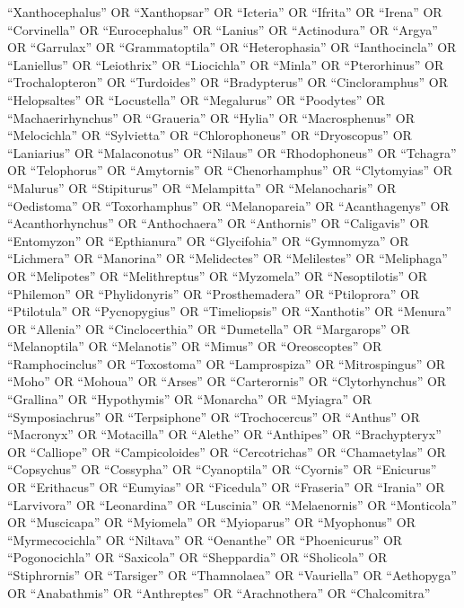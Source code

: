 \documentclass[
  number,
  review,
  onecolumn]{elsarticle}
\begin{document}
``Xanthocephalus'' OR ``Xanthopsar'' OR ``Icteria'' OR ``Ifrita'' OR
``Irena'' OR ``Corvinella'' OR ``Eurocephalus'' OR ``Lanius'' OR
``Actinodura'' OR ``Argya'' OR ``Garrulax'' OR ``Grammatoptila'' OR
``Heterophasia'' OR ``Ianthocincla'' OR ``Laniellus'' OR ``Leiothrix''
OR ``Liocichla'' OR ``Minla'' OR ``Pterorhinus'' OR ``Trochalopteron''
OR ``Turdoides'' OR ``Bradypterus'' OR ``Cincloramphus'' OR
``Helopsaltes'' OR ``Locustella'' OR ``Megalurus'' OR ``Poodytes'' OR
``Machaerirhynchus'' OR ``Graueria'' OR ``Hylia'' OR ``Macrosphenus'' OR
``Melocichla'' OR ``Sylvietta'' OR ``Chlorophoneus'' OR ``Dryoscopus''
OR ``Laniarius'' OR ``Malaconotus'' OR ``Nilaus'' OR ``Rhodophoneus'' OR
``Tchagra'' OR ``Telophorus'' OR ``Amytornis'' OR ``Chenorhamphus'' OR
``Clytomyias'' OR ``Malurus'' OR ``Stipiturus'' OR ``Melampitta'' OR
``Melanocharis'' OR ``Oedistoma'' OR ``Toxorhamphus'' OR
``Melanopareia'' OR ``Acanthagenys'' OR ``Acanthorhynchus'' OR
``Anthochaera'' OR ``Anthornis'' OR ``Caligavis'' OR ``Entomyzon'' OR
``Epthianura'' OR ``Glycifohia'' OR ``Gymnomyza'' OR ``Lichmera'' OR
``Manorina'' OR ``Melidectes'' OR ``Melilestes'' OR ``Meliphaga'' OR
``Melipotes'' OR ``Melithreptus'' OR ``Myzomela'' OR ``Nesoptilotis'' OR
``Philemon'' OR ``Phylidonyris'' OR ``Prosthemadera'' OR ``Ptiloprora''
OR ``Ptilotula'' OR ``Pycnopygius'' OR ``Timeliopsis'' OR ``Xanthotis''
OR ``Menura'' OR ``Allenia'' OR ``Cinclocerthia'' OR ``Dumetella'' OR
``Margarops'' OR ``Melanoptila'' OR ``Melanotis'' OR ``Mimus'' OR
``Oreoscoptes'' OR ``Ramphocinclus'' OR ``Toxostoma'' OR ``Lamprospiza''
OR ``Mitrospingus'' OR ``Moho'' OR ``Mohoua'' OR ``Arses'' OR
``Carterornis'' OR ``Clytorhynchus'' OR ``Grallina'' OR ``Hypothymis''
OR ``Monarcha'' OR ``Myiagra'' OR ``Symposiachrus'' OR ``Terpsiphone''
OR ``Trochocercus'' OR ``Anthus'' OR ``Macronyx'' OR ``Motacilla'' OR
``Alethe'' OR ``Anthipes'' OR ``Brachypteryx'' OR ``Calliope'' OR
``Campicoloides'' OR ``Cercotrichas'' OR ``Chamaetylas'' OR
``Copsychus'' OR ``Cossypha'' OR ``Cyanoptila'' OR ``Cyornis'' OR
``Enicurus'' OR ``Erithacus'' OR ``Eumyias'' OR ``Ficedula'' OR
``Fraseria'' OR ``Irania'' OR ``Larvivora'' OR ``Leonardina'' OR
``Luscinia'' OR ``Melaenornis'' OR ``Monticola'' OR ``Muscicapa'' OR
``Myiomela'' OR ``Myioparus'' OR ``Myophonus'' OR ``Myrmecocichla'' OR
``Niltava'' OR ``Oenanthe'' OR ``Phoenicurus'' OR ``Pogonocichla'' OR
``Saxicola'' OR ``Sheppardia'' OR ``Sholicola'' OR ``Stiphrornis'' OR
``Tarsiger'' OR ``Thamnolaea'' OR ``Vauriella'' OR ``Aethopyga'' OR
``Anabathmis'' OR ``Anthreptes'' OR ``Arachnothera'' OR ``Chalcomitra''
\end{document}
